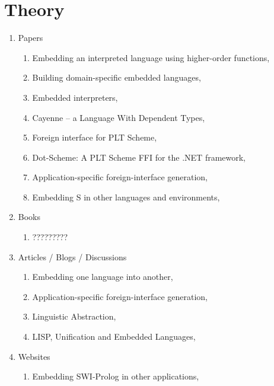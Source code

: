 \documentclass[thesis-solanki.tex]{subfiles}
\begin{document}
\section{Theory}
\begin{enumerate}
\item Papers
\begin{enumerate}
\item Embedding an interpreted language using higher-order functions, \cite{ramsey2003embedding}
\item Building domain-specific embedded languages, \cite{hudak1996building}
\item Embedded interpreters, \cite{benton2005embedded}
\item Cayenne -- a Language With Dependent Types, \cite{Augustsson98cayenne--}
\item Foreign interface for PLT Scheme, \cite{barzilay2004foreign}
\item Dot-Scheme: A PLT Scheme FFI for the .NET framework, \cite{pinto2003dot}
\item Application-specific foreign-interface generation, \cite{reppy2006application}
\item Embedding S in other languages and environments, \cite{lang2001embedding}
\end{enumerate}
\item Books
\begin{enumerate}
\item ?????????
\end{enumerate}
\item Articles / Blogs / Discussions
\begin{enumerate}
\item Embedding one language into another, \cite{website:lambda-the-ultimate-2}
\item Application-specific foreign-interface generation, \cite{website:lambda-the-ultimate-3}
\item Linguistic Abstraction, \cite{audklangembedd}
\item LISP, Unification and Embedded Languages, \cite{ummlisp}
\end{enumerate}
\item Websites
\begin{enumerate}
\item Embedding SWI-Prolog in other applications, \cite{swipembedd}
\end{enumerate}
\end{enumerate}
\end{document}
